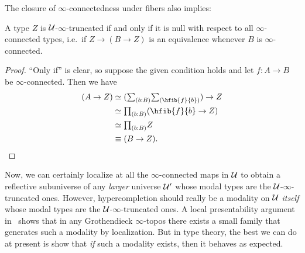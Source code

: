 The closure of $\infty$-connectedness under fibers also implies:

\begin{lem}\label{thm:trunc-null}
  A type $Z$ is $\mathcal{U}$-$\infty$-truncated if and only if it is null with respect to all $\infty$-connected types, i.e.\ if $Z \to (B\to Z)$ is an equivalence whenever $B$ is $\infty$-connected.
\end{lem}
\begin{proof}
  ``Only if'' is clear, so suppose the given condition holds and let $f:A\to B$ be $\infty$-connected.
  Then we have
  \begin{align*}
    (A \to Z)
    &\simeq (\sm{b:B}\hfib{f}{b}) \to Z\\
    &\simeq \prd{b:B} (\hfib{f}{b} \to Z)\\
    &\simeq \prd{b:B} Z\\
    &\jdeq (B\to Z).\qedhere
  \end{align*}
\end{proof}

Now, we can certainly localize at all the $\infty$-connected maps in $\mathcal{U}$ to obtain a reflective subuniverse of any \emph{larger} universe $\mathcal{U}'$ whose modal types are the $\mathcal{U}$-$\infty$-truncated ones.
However, hypercompletion should really be a modality on $\mathcal{U}$ \emph{itself} whose modal types are the $\mathcal{U}$-$\infty$-truncated ones.
A local presentability argument in~\cite[Prop.~6.5.2.8]{lurie2009higher} shows that in any Grothendieck $\infty$-topos there exists a small family that generates such a modality by localization.
But in type theory, the best we can do at present is show that \emph{if} such a modality exists, then it behaves as expected.

